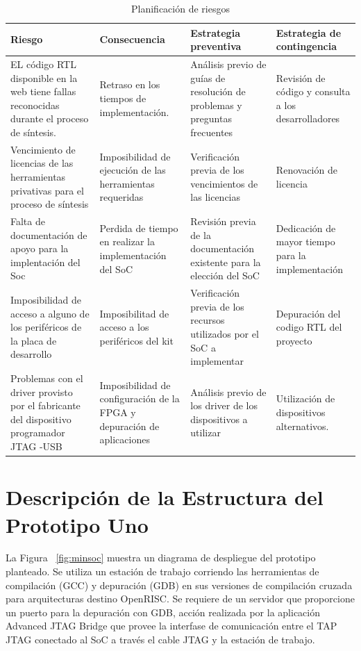 		\begin{table}[h!]
		\centering
		\begin{tabular}{ p{4cm} p{4cm} p{4cm} p{3cm} }
		\hline 
		\rowcolor[gray]{0.8} Riesgo & Consecuencia & Estrategia preventiva & Estrategia de contingencia\\
		\hline
		EL código RTL disponible en la web tiene fallas reconocidas durante el proceso de síntesis.&Retraso en los tiempos de implementación.& Análisis previo de guías de resolución de problemas y preguntas frecuentes & Revisión de código y consulta a los desarrolladores \\
		\hline
		Vencimiento de licencias de las herramientas privativas para el proceso de síntesis & Imposibilidad de ejecución de las herramientas requeridas & Verificación previa de los vencimientos de las licencias & Renovación de licencia \\	 
		\hline
		Falta de documentación de apoyo para la implentación
del Soc& Perdida de tiempo en realizar la implementación
del SoC & Revisión previa de la documentación existente para la elección del
SoC & Dedicación de mayor tiempo para la implementación\\ 
		\hline
		 Imposibilidad de acceso a alguno de los periféricos de la placa de desarrollo & Imposibilitad de acceso a los periféricos del kit &Verificación previa de los recursos utilizados por el SoC a implementar & Depuración del codigo RTL del proyecto\\		
		\hline
		Problemas con el driver provisto por el fabricante del  dispositivo programador JTAG -USB  & Imposibilidad de configuración de la FPGA y depuración de aplicaciones &Análisis previo de los driver de los dispositivos a utilizar &  Utilización de dispositivos alternativos.\\		
		\hline
		\end{tabular}
		\caption{Planificación de riesgos}
		\end{table}



		\newpage
		\section{Descripción de la Estructura del Prototipo Uno}
			

		La Figura ~\ref{fig:minsoc} muestra un diagrama de despliegue del prototipo planteado. Se utiliza un estación de trabajo corriendo las herramientas de compilación (GCC) y depuración (GDB) en sus versiones de compilación cruzada para arquitecturas destino OpenRISC. Se requiere de un
		servidor que proporcione un puerto para la depuración con GDB, acción realizada por la aplicación Advanced JTAG Bridge que provee la interfase de comunicación entre el TAP JTAG conectado al SoC a través el cable JTAG y la estación de trabajo.
		
